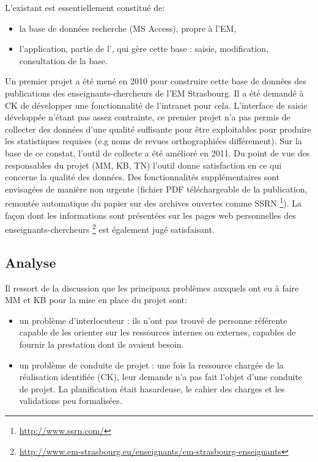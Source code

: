 \documentclass{book}
\begin{document}
L'existant est essentiellement constitué de:
\begin{itemize}
\item la base de données recherche (MS Access), propre à l'EM,
\item l'application, partie de l', qui gère cette base : saisie, 
modification, consultation de la base.
\end{itemize}
Un premier projet a été mené en 2010 pour construire cette base de données des
publications des enseignants-chercheurs de l'EM Strasbourg. Il a été demandé à 
CK de développer une fonctionnalité de l'intranet pour cela. L'interface de 
saisie développée n'étant pas assez contrainte, ce premier projet n'a pas 
permis de collecter des données d'une qualité suffisante pour être exploitables
pour produire les statistiques requises (e.g noms de revues orthographiées 
différement). Sur la base de ce constat, l'outil de collecte a été amélioré en 
2011. Du point de vue des responsables du projet (MM, KB, TN) l'outil donne 
satisfaction en ce qui concerne la qualité des données. Des fonctionnalités 
supplémentaires sont envisagées de manière non urgente (fichier PDF téléchargeable 
de la publication, remontée automatique du papier sur des archives ouvertes comme SSRN%
\footnote{\url{ http://www.ssrn.com/}}).
La façon dont les informations sont présentées sur les pages web personnelles
des enseignants-chercheurs%
\footnote{\url{http://www.em-strasbourg.eu/enseignants/em-strasbourg-enseignants}}
est également jugé satisfaisant.


\subsection{Analyse}

Il ressort de la discussion que les principaux problèmes auxquels ont eu à 
faire MM et KB pour la mise en place du projet sont:
\begin{itemize}
\item un problème d'interlocuteur : ils n'ont pas trouvé de personne référente 
capable de les orienter sur les ressources internes ou externes, capables de fournir 
la prestation dont ils avaient besoin.
\item un problème de conduite de projet : une fois la ressource chargée de la 
réalisation identifiée (CK), leur demande n'a pas fait l'objet d'une conduite
de projet. La planification était hasardeuse, le cahier des charges et
les validations peu formalisées.
\end{itemize}
\end{document}
